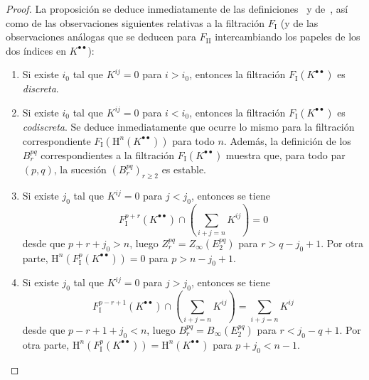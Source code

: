 \documentclass[10pt,oneside,openany]{book}
\theoremstyle{egaenv}\newtheorem*{env}{---}
\theoremstyle{egastatement}
\theoremstyle{egadescription}
\newcommand{\oldpage}[2][]{\marginnote{\normalfont\scriptsize\textbf{#1}\,|\,#2}\ignorespaces}
\renewcommand{\geq}{\geqslant}
\begin{document}
\begin{proof}
La proposición se deduce inmediatamente de las definiciones~ y de~, así como de las observaciones siguientes relativas a la filtración $F_{\mathrm I}$ (y de las observaciones análogas que se deducen para $F_{\mathrm{II}}$ intercambiando los papeles de los dos índices en $K^{\bullet\bullet}$):
\begin{enumerate}
  \item[{$1^\circ$}] Si existe $i_0$ tal que $K^{ij}=0$ para $i>i_0$, entonces la filtración $F_{\mathrm I}(K^{\bullet\bullet})$ es \emph{discreta}.
  \item[{$2^\circ$}] Si existe $i_0$ tal que $K^{ij}=0$ para $i<i_0$, entonces la filtración $F_{\mathrm I}(K^{\bullet\bullet})$ es \emph{codiscreta}.
    Se deduce inmediatamente que ocurre lo mismo para la filtración correspondiente $F_{\mathrm I}(\mathrm H^n(K^{\bullet\bullet}))$ para todo $n$.
    Además, la definición de los $B_r^{pq}$ correspondientes a la filtración $F_{\mathrm I}(K^{\bullet\bullet})$  muestra que, para todo par $(p,q)$, la sucesión $(B_r^{pq})_{r\geq2}$ es estable.
  \item[{$3^\circ$}] Si existe $j_0$ tal que $K^{ij}=0$ para $j<j_0$, entonces se tiene
    \[
      F_{\mathrm I}^{p+r}(K^{\bullet\bullet})
      \cap\left(\sum_{i+j=n}K^{ij}\right)=0
    \]
    desde que $p+r+j_0>n$, luego $Z_r^{pq}=Z_\infty(E_2^{pq})$ para $r>q-j_0+1$.
    Por otra parte, $\mathrm H^n(F_{\mathrm I}^p(K^{\bullet\bullet}))=0$ para $p>n-j_0+1$.
  \item[{$4^\circ$}] Si existe $j_0$ tal que $K^{ij}=0$ para $j>j_0$, entonces se tiene
    \[
      F_{\mathrm I}^{p-r+1}(K^{\bullet\bullet})
      \cap\left(\sum_{i+j=n}K^{ij}\right)=\sum_{i+j=n}K^{ij}
    \]
    \oldpage[0\textsubscript{III}]{31}
    desde que $p-r+1+j_0<n$, luego $B_r^{pq}=B_\infty(E_2^{pq})$ para $r<j_0-q+1$.
    Por otra parte, $\mathrm H^n(F_{\mathrm I}^p(K^{\bullet\bullet}))
    =\mathrm H^n(K^{\bullet\bullet})$ para $p+j_0<n-1$.
\end{enumerate}
\end{proof}
\end{document}
